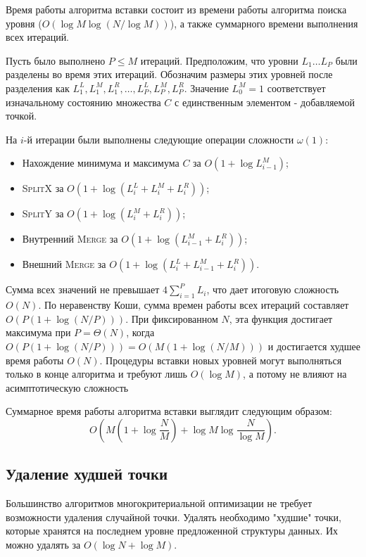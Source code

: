 Время работы алгоритма вставки состоит из времени работы алгоритма поиска уровня 
($O(\log M \log (N / \log M))$), а также суммарного времени выполнения всех итераций.

Пусть было выполнено $P \le M$ итераций. Предположим, что уровни $L_1 \ldots L_P$ 
были разделены во время этих итераций. Обозначим размеры этих уровней после разделения как
$L_1^L, L_1^M, L_1^R, \ldots, L_P^L, L_P^M, L_P^R$. Значение $L_0^M = 1$ соответствует 
изначальному состоянию множества $C$ с единственным элементом - добавляемой точкой.

На $i$-й итерации были выполнены следующие операции сложности $\omega(1)$:
\begin{itemize}
    \item Нахождение минимума и максимума $C$ за $O(1 + \log L_{i-1}^M)$;
    \item \textsc{SplitX} за $O(1 + \log(L_i^L + L_i^M + L_i^R))$;
    \item \textsc{SplitY} за $O(1 + \log(L_i^M + L_i^R))$;
    \item Внутренний \textsc{Merge} за $O(1 + \log(L_{i-1}^M + L_i^R))$;
    \item Внешний \textsc{Merge} за $O(1 + \log(L_i^L + L_{i-1}^M + L_i^R))$.
\end{itemize}

Сумма всех значений не превышает $4 \sum_{i=1}^{P}{L_i}$, что дает итоговую сложность $O(N)$. 
По неравенству Коши, сумма времен работы всех итераций составляет $O(P (1 + \log (N/P)))$. 
При фиксированном $N$, эта функция достигает максимума при $P = \Theta(N)$,
когда $O(P (1 + \log(N/P))) = O(M(1+ \log(N/M)))$ и достигается худшее время работы $O(N)$. 
Процедуры вставки новых уровней могут выполняться только в конце алгоритма и требуют лишь $O(\log M)$,
а потому не влияют на асимптотическую сложность

Суммарное время работы алгоритма вставки выглядит следующим образом:
$$O\left(M \left(1 + \log\frac{N}{M}\right) + \log M \log \frac{N}{\log M}\right).$$

\subsection{Удаление худшей точки}
\label{algo-delete}
Большинство алгоритмов многокритериальной оптимизации не требует возможности удаления случайной точки.
Удалять необходимо "худшие" точки, которые хранятся на последнем уровне предложенной структуры данных.
Их можно удалять за $O(\log N + \log M)$.